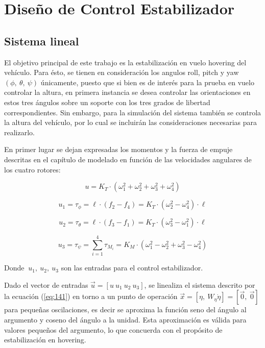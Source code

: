 \documentclass[../main.tex]{subfiles}
\begin{document}
\chapter{Diseño de Control Estabilizador}\label{Diseo de Control Estabilizador}
\section{Sistema lineal}

El objetivo principal de este trabajo es la estabilización en vuelo
hovering del vehículo. Para ésto, se tienen en consideración los angulos
roll, pitch y yaw $(\phi,\ \theta,\ \psi)$ únicamente, puesto que
si bien es de interés para la prueba en vuelo controlar la altura,
en primera instancia se desea controlar las orientaciones en estos
tres ángulos sobre un soporte con los tres grados de libertad correspondientes.
Sin embargo, para la simulación del sistema también se controla la
altura del vehículo, por lo cual se incluirán las consideraciones
necesarias para realizarlo.

En primer lugar se dejan expresadas los momentos y la fuerza de empuje
descritas en el capítulo de modelado en función de las velocidades
angulares de los cuatro rotores:

\begin{equation}
u=K_{T}\cdot(\omega_{1}^{2}+\omega_{2}^{2}+\omega_{3}^{2}+\omega_{4}^{2})
\end{equation}

\begin{equation}
u_{1}=\tau_{\phi}=\ell\cdot(f_{2}-f_{4})=K_{T}\cdot(\omega_{2}^{2}-\omega_{4}^{2})\cdot\ell
\end{equation}

\begin{equation}
u_{2}=\tau_{\theta}=\ell\cdot(f_{3}-f_{1})=K_{T}\cdot(\omega_{3}^{2}-\omega_{1}^{2})\cdot\ell
\end{equation}

\begin{equation}
u_{3}=\tau_{\psi}=\sum_{i=1}^{4}\tau_{M_{i}}=K_{M}\cdot(\omega_{1}^{2}-\omega_{2}^{2}+\omega_{3}^{2}-\omega_{4}^{2})
\end{equation}

Donde $\ u_{1},\ u_{2},\ u_{3}$ son las entradas para el control
estabilizador. 

Dado el vector de entradas $\vec{u}=[u\ u_{1}\ u_{2}\ u_{3}]$, se
linealiza el sistema descrito por la ecuación  (\ref{eq:141}) en torno a un punto
de operación $\vec{x}=[\eta,\ W_{\eta}\dot{\eta}]=[\vec{0},\ \vec{0}]$
para pequeñas oscilaciones, es decir se aproxima la función seno del
ángulo al argumento y coseno del ángulo a la unidad. Esta aproximación
es válida para valores pequeños del argumento, lo que concuerda con
el propósito de estabilización en hovering.
\end{document}
